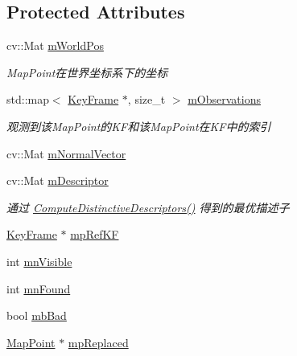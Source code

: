 \subsection*{Protected Attributes}
\begin{DoxyCompactItemize}
\item 
cv\+::\+Mat \mbox{\hyperlink{class_o_r_b___s_l_a_m2_1_1_map_point_a39741adada8dcd302afbf45ec2e72af0}{m\+World\+Pos}}
\begin{DoxyCompactList}\small\item\em Map\+Point在世界坐标系下的坐标 \end{DoxyCompactList}\item 
std\+::map$<$ \mbox{\hyperlink{class_o_r_b___s_l_a_m2_1_1_key_frame}{Key\+Frame}} $\ast$, size\+\_\+t $>$ \mbox{\hyperlink{class_o_r_b___s_l_a_m2_1_1_map_point_a189bea541f860af75ceb60300b59d8e3}{m\+Observations}}
\begin{DoxyCompactList}\small\item\em 观测到该\+Map\+Point的\+K\+F和该\+Map\+Point在\+K\+F中的索引 \end{DoxyCompactList}\item 
cv\+::\+Mat \mbox{\hyperlink{class_o_r_b___s_l_a_m2_1_1_map_point_aba0cff72e2182ff72d32edd77dc7832d}{m\+Normal\+Vector}}
\item 
cv\+::\+Mat \mbox{\hyperlink{class_o_r_b___s_l_a_m2_1_1_map_point_ac2a05b8ddc806ecc6939f42d13828876}{m\+Descriptor}}
\begin{DoxyCompactList}\small\item\em 通过 \mbox{\hyperlink{class_o_r_b___s_l_a_m2_1_1_map_point_ab4c3dfd8f5f05a4b1888021f1fac3d84}{Compute\+Distinctive\+Descriptors()}} 得到的最优描述子 \end{DoxyCompactList}\item 
\mbox{\hyperlink{class_o_r_b___s_l_a_m2_1_1_key_frame}{Key\+Frame}} $\ast$ \mbox{\hyperlink{class_o_r_b___s_l_a_m2_1_1_map_point_a27cc4fee44b1ae77b24a8c766c617058}{mp\+Ref\+KF}}
\item 
int \mbox{\hyperlink{class_o_r_b___s_l_a_m2_1_1_map_point_aadb2c83e36dc01e47983f57e831bac7b}{mn\+Visible}}
\item 
int \mbox{\hyperlink{class_o_r_b___s_l_a_m2_1_1_map_point_a1defea85441b8063ef9ebb47c9959289}{mn\+Found}}
\item 
bool \mbox{\hyperlink{class_o_r_b___s_l_a_m2_1_1_map_point_aa8f2fc3c4b67c04e97162a5084e1dada}{mb\+Bad}}
\item 
\mbox{\hyperlink{class_o_r_b___s_l_a_m2_1_1_map_point}{Map\+Point}} $\ast$ \mbox{\hyperlink{class_o_r_b___s_l_a_m2_1_1_map_point_abf1fe1c8a41919e1890b70baa18bd2fb}{mp\+Replaced}}

\end{DoxyCompactItemize}
